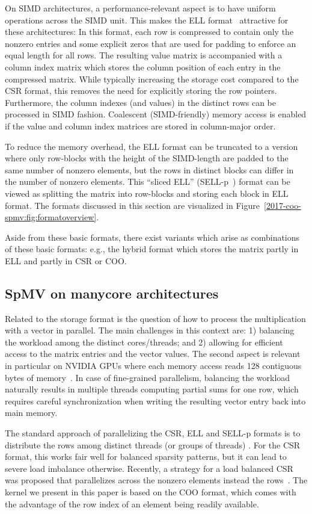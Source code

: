 On SIMD architectures, a performance-relevant aspect is to have uniform operations
across the SIMD unit. This makes the ELL format~\cite{ellpack} attractive for these architectures:
In this format, each row is compressed to contain only the nonzero entries 
and some explicit zeros that are used for padding to enforce
an equal length for all rows.
The resulting value matrix is accompanied with a column index matrix which stores
the column position of each entry in the compressed matrix.
While typically increasing the storage cost compared to the CSR format,
this removes the need for explicitly storing the row pointers.
Furthermore, the column indexes (and values) in the distinct
rows can be processed in SIMD fashion.
Coalescent (SIMD-friendly) memory access is enabled if the value and column
index matrices are stored in column-major order.

To reduce the memory overhead, the ELL format can be truncated to a version
where only row-blocks with the height of the SIMD-length are padded to the
same number of nonzero elements, but the rows in distinct blocks can differ in
the number of nonzero elements.
This ``sliced ELL'' (SELL-p~\cite{sellcs}) format can be viewed as splitting the matrix into row-blocks
and storing each block in ELL format.
The formats discussed in this section are visualized
in Figure~\ref{2017-coo-spmv:fig:formatoverview}.

Aside from these basic formats, there exist variants
which arise as combinations of these basic formats:
e.g., the hybrid format which stores the matrix partly in ELL and partly in
CSR or COO.


\subsection{SpMV on manycore architectures}

Related to the storage format is the question of how to process
the multiplication with a vector in parallel.
The main challenges in this context are: 
1) balancing the workload among the distinct cores/threads; and 
2) allowing for efficient access to the matrix entries and the vector values.
The second aspect is relevant in particular on NVIDIA GPUs where each memory access
reads 128 contiguous bytes of memory~\cite{cuda8.0}.
In case of fine-grained parallelism, balancing the workload naturally results in 
multiple threads computing partial sums for one row, which requires careful synchronization
when writing the resulting vector entry back into main memory.

The standard approach of parallelizing the CSR, ELL and SELL-p formats is to
distribute the rows among distinct threads (or groups of threads)
\cite{ellpack, sellc}.
For the CSR format, this works fair well for balanced sparsity patterns, but it can lead to
severe load imbalance otherwise. 
Recently, a strategy for a load balanced CSR \spmv was proposed that 
parallelizes across the nonzero elements instead the rows~\cite{csri}. 
The \spmv kernel we present in this paper is based on the COO format, which 
comes with the advantage of the row index of an element being readily available.
